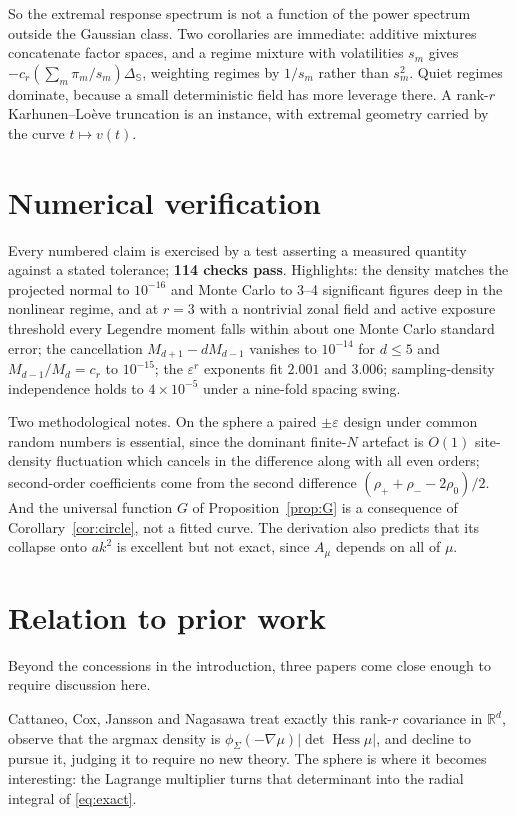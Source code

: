 \documentclass[11pt]{article}
\theoremstyle{definition}
\DeclareMathOperator{\Hess}{Hess}
\newcommand{\R}{\mathbb{R}}
\newcommand{\Sph}{\mathbb{S}}
\newcommand{\Lap}{\Delta_{\Sph}}
\begin{document}
So the extremal response spectrum is not a function of the power spectrum
outside the Gaussian class. Two corollaries are immediate: additive mixtures
concatenate factor spaces, and a regime mixture with volatilities $s_{m}$ gives
$-c_{r}(\sum_{m}\pi_{m}/s_{m})\Lap$, weighting regimes by $1/s_{m}$ rather than
$s_{m}^{2}$. Quiet regimes dominate, because a small deterministic field has
more leverage there. A rank-$r$ Karhunen--Lo\`eve truncation is an instance,
with extremal geometry carried by the curve $t\mapsto v(t)$.

\section{Numerical verification}\label{sec:numerics}

Every numbered claim is exercised by a test asserting a measured quantity
against a stated tolerance; \textbf{114 checks pass}. Highlights: the density
matches the projected normal to $10^{-16}$ and Monte Carlo to 3--4 significant
figures deep in the nonlinear regime, and at $r=3$ with a nontrivial zonal
field and active exposure threshold every Legendre moment falls within about
one Monte Carlo standard error; the cancellation $M_{d+1}-dM_{d-1}$ vanishes to
$10^{-14}$ for $d\le5$ and $M_{d-1}/M_{d}=c_{r}$ to $10^{-15}$; the
$\varepsilon^{r}$ exponents fit $2.001$ and $3.006$; sampling-density
independence holds to $4\times10^{-5}$ under a nine-fold spacing swing.

Two methodological notes. On the sphere a paired $\pm\varepsilon$ design under
common random numbers is essential, since the dominant finite-$N$ artefact is
$O(1)$ site-density fluctuation which cancels in the difference along with all
even orders; second-order coefficients come from the second difference
$(\rho_{+}+\rho_{-}-2\rho_{0})/2$. And the universal function $G$ of
Proposition~\ref{prop:G} is a consequence of Corollary~\ref{cor:circle}, not a
fitted curve. The derivation also predicts that its collapse onto $ak^{2}$ is
excellent but not exact, since $A_{\mu}$ depends on all of $\mu$.

\section{Relation to prior work}

Beyond the concessions in the introduction, three papers come close enough to
require discussion here.

Cattaneo, Cox, Jansson and Nagasawa \cite{CCJN} treat exactly this rank-$r$
covariance in $\R^{d}$, observe that the argmax density is
$\phi_{\Sigma}(-\nabla\mu)\lvert\det\Hess\mu\rvert$, and decline to pursue it,
judging it to require no new theory. The sphere is where it becomes
interesting: the Lagrange multiplier turns that determinant into the radial
integral of \eqref{eq:exact}.
\end{document}
